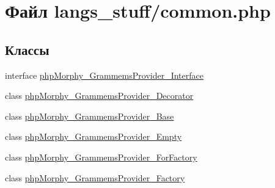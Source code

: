 \hypertarget{langs__stuff_2common_8php}{
\section{Файл langs\_\-stuff/common.php}
\label{langs__stuff_2common_8php}
}
\subsection*{Классы}
\begin{DoxyCompactItemize}
\item 
interface \hyperlink{interfacephpMorphy__GrammemsProvider__Interface}{phpMorphy\_\-GrammemsProvider\_\-Interface}
\item 
class \hyperlink{classphpMorphy__GrammemsProvider__Decorator}{phpMorphy\_\-GrammemsProvider\_\-Decorator}
\item 
class \hyperlink{classphpMorphy__GrammemsProvider__Base}{phpMorphy\_\-GrammemsProvider\_\-Base}
\item 
class \hyperlink{classphpMorphy__GrammemsProvider__Empty}{phpMorphy\_\-GrammemsProvider\_\-Empty}
\item 
class \hyperlink{classphpMorphy__GrammemsProvider__ForFactory}{phpMorphy\_\-GrammemsProvider\_\-ForFactory}
\item 
class \hyperlink{classphpMorphy__GrammemsProvider__Factory}{phpMorphy\_\-GrammemsProvider\_\-Factory}
\end{DoxyCompactItemize}

